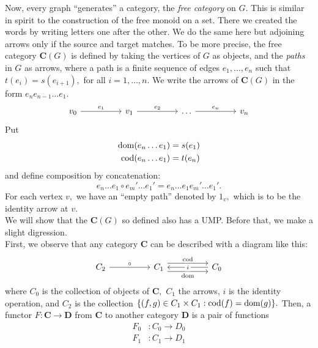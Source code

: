 Now, every graph ``generates'' a category, the \emph{free category} on $G.$ This is similar in spirit to the construction of the free monoid on a set. There we created the words by writing letters one after the other. We do the same here but adjoining arrows only if the source and target matches. To be more precise, the free category $\mathbf{C}(G)$ is defined by taking the vertices of $G$ as objects, and the \emph{paths} in $G$ as arrows, where a path is a finite sequence of edges $e_1, \ldots, e_n$ such that $t(e_i) = s(e_{i+1}),$ for all $i = 1, \ldots, n.$ We write the arrows of $\mathbf{C}(G)$ in the form $e_ne_{n-1}\ldots e_1.$
\begin{equation*} 
	\begin{tikzcd}
		v_0 \arrow[rr, "e_1"] && v_1 \arrow[rr, "e_2"] && \ldots \arrow[rr, "e_n"] && v_n
	\end{tikzcd}
\end{equation*}
Put
\begin{align*} 
	\operatorname{dom}(e_n\ldots e_1) &= s(e_1)\\
	\operatorname{cod}(e_n\ldots e_1) &= t(e_n)
\end{align*}
and define composition by concatenation:
\begin{equation*} 
	e_n\ldots e_1 \circ e_m' \ldots e_1' = e_n\ldots e_1e_m'\ldots e_1'.
\end{equation*}
For each vertex $v,$ we have an ``empty path'' denoted by $1_v,$ which is to be the identity arrow at $v.$\\
We will show that the $\mathbf{C}(G)$ so defined also has a UMP. Before that, we make a slight digression.\\
First, we observe that any category $\mathbf{C}$ can be described with a diagram like this:
\begin{equation*} 
	\begin{tikzcd}
	C_2 \arrow[rr, "\circ"] &  & C_1 \arrow[rr, "\cod", shift left=2] \arrow[rr, "\dom"', shift right=2] &  & C_0 \arrow[ll, "i" description]
	\end{tikzcd}
\end{equation*}
where $C_0$ is the collection of objects of $\mathbf{C},$ $C_1$ the arrows, $i$	 is the identity operation, and $C_2$ is the collection $\{(f, g) \in C_1 \times C_1 : \operatorname{cod}(f) = \operatorname{dom}(g)\}.$
Then, a functor $F:\mathbf{C} \to \mathbf{D}$ from $\mathbf{C}$ to another category $\mathbf{D}$ is a pair of functions
\begin{align*} 
	F_0 &: C_0 \to D_0\\
	F_1 &: C_1 \to D_1
\end{align*}
